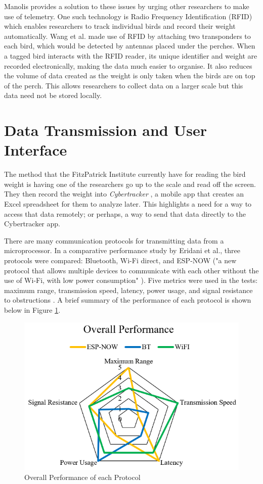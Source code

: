 \documentclass[class=report,11pt,crop=false]{standalone}
\begin{document}
Manolis \cite{manoils2024simple} provides a solution to these issues by urging other researchers to make use of telemetry. One such technology is Radio Frequency Identification (RFID) which enables researchers to track individual birds and record their weight automatically. Wang et al. \cite{wang2019rfid} made use of RFID by attaching two transponders to each bird, which would be detected by antennas placed under the perches. When a tagged bird interacts with the RFID reader, its unique identifier and weight are recorded electronically,  making the data much easier to organise. It also reduces the volume of data created as the weight is only taken when the birds are on top of the perch. This allows researchers to collect data on a larger scale but this data need not be stored locally. 

\section{Data Transmission and User Interface}
The method that the FitzPatrick Institute currently have for reading the bird weight is having one of the researchers go up to the scale and read off the screen. They then record the weight into \textit{Cybertracker} \cite{cybertracker}, a mobile app that creates an Excel spreadsheet for them to analyze later. This highlights a need for a way to access that data remotely; or perhaps, a way to send that data directly to the Cybertracker app.

There are many communication protocols for transmitting data from a microprocessor. In a comparative performance study by Eridani et al., three protocols were compared: Bluetooth, Wi-Fi direct, and ESP-NOW ("a new protocol that allows multiple devices to communicate with each other without the use of Wi-Fi, with low power consumption" \cite{comparitiveEspnow}). Five metrics were used in the tests: maximum range, transmission speed, latency, power usage, and signal resistance to obstructions \cite{comparitiveEspnow}. A brief summary of the performance of each protocol is shown below in Figure \ref{fig:performance}.
\begin{figure}[h]
	\centering
	\includegraphics[width=0.7\linewidth]{Figures/performance}
	\caption{Overall Performance of each Protocol \cite{comparitiveEspnow}}
	\label{fig:performance}
\end{figure}
\end{document}
